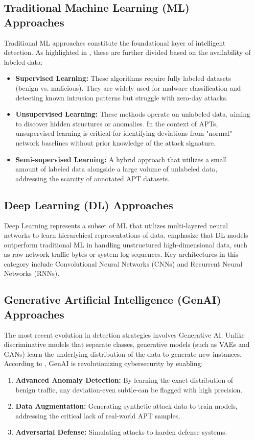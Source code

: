 \subsection{Traditional Machine Learning (ML) Approaches}
Traditional ML approaches constitute the foundational layer of intelligent detection. As highlighted in \cite{ankalaki2025cyber}, these are further divided based on the availability of labeled data:
\begin{itemize}
    \item \textbf{Supervised Learning:} These algorithms require fully labeled datasets (benign vs. malicious). They are widely used for malware classification and detecting known intrusion patterns but struggle with zero-day attacks.
    \item \textbf{Unsupervised Learning:} These methods operate on unlabeled data, aiming to discover hidden structures or anomalies. In the context of APTs, unsupervised learning is critical for identifying deviations from "normal" network baselines without prior knowledge of the attack signature.
    \item \textbf{Semi-supervised Learning:} A hybrid approach that utilizes a small amount of labeled data alongside a large volume of unlabeled data, addressing the scarcity of annotated APT datasets.
\end{itemize}

\subsection{Deep Learning (DL) Approaches}
Deep Learning represents a subset of ML that utilizes multi-layered neural networks to learn hierarchical representations of data. \cite{ankalaki2025cyber} emphasize that DL models outperform traditional ML in handling unstructured high-dimensional data, such as raw network traffic bytes or system log sequences. Key architectures in this category include Convolutional Neural Networks (CNNs) and Recurrent Neural Networks (RNNs).

\subsection{Generative Artificial Intelligence (GenAI) Approaches}
The most recent evolution in detection strategies involves Generative AI. Unlike discriminative models that separate classes, generative models (such as VAEs and GANs) learn the underlying distribution of the data to generate new instances. According to \cite{ankalaki2025cyber}, GenAI is revolutionizing cybersecurity by enabling:
\begin{enumerate}
    \item \textbf{Advanced Anomaly Detection:} By learning the exact distribution of benign traffic, any deviation-even subtle-can be flagged with high precision.
    \item \textbf{Data Augmentation:} Generating synthetic attack data to train models, addressing the critical lack of real-world APT samples.
    \item \textbf{Adversarial Defense:} Simulating attacks to harden defense systems.
\end{enumerate}




